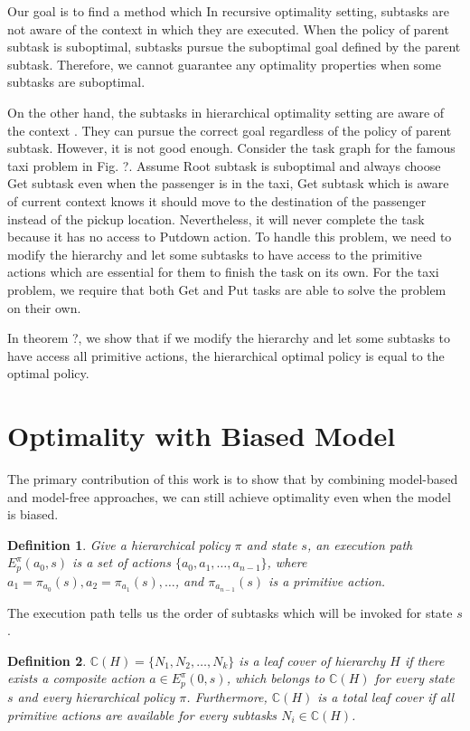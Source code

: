 \documentclass{article} %
\newtheorem{definition}{Definition}
\begin{document}
Our goal is to find a method which 
In recursive optimality setting, subtasks are not aware of the context in which they are executed.
When the policy of parent subtask is suboptimal, subtasks pursue the suboptimal goal defined by the parent subtask.
Therefore, we cannot guarantee any optimality properties when some subtasks are suboptimal.

On the other hand, the subtasks in hierarchical optimality setting are aware of the context . 
They can pursue the correct goal regardless of the policy of parent subtask.
However, it is not good enough. Consider the task graph for the famous taxi problem in Fig. ?.  
Assume Root subtask is suboptimal and always choose Get subtask even when 
the passenger is in the taxi, Get subtask which is aware of current context knows
it should move to the destination of the passenger instead of the pickup location.
Nevertheless, it will never complete the task because it has no access to Putdown 
action. To handle this problem, we need to modify the hierarchy and let some subtasks 
to have access to the primitive actions which are essential for them to finish
the task on its own. For the taxi problem, we require that both Get and Put tasks
are able to solve the problem on their own.

In theorem ?, we show that if we modify the hierarchy and let some subtasks to have access all primitive actions, 
the hierarchical optimal policy is equal to the optimal policy.

\section{Optimality with Biased Model}
The primary contribution of this work is to show that by combining model-based and 
model-free approaches, we can still achieve optimality even when the model is biased.


\begin{definition}
    Give a hierarchical policy $\pi$ and state $s$, an execution path $E_p^\pi(a_0, s)$ 
    is a set of actions $\{a_0, a_1, \dots, a_{n-1}\}$, where $a_1=\pi_{a_0}(s), a_2=\pi_{a_1}(s), \dots$,
    and $\pi_{a_{n-1}}(s)$ is a primitive action.
\end{definition}
The execution path tells us the order of subtasks which will be invoked for state $s$.


\begin{definition}
    $\mathbb{C}(H) = \{N_1, N_2, \dots, N_k\}$ is a leaf cover of hierarchy $H$ if 
    there exists a composite action $a \in E_p^{\pi}(0, s)$, which belongs to $\mathbb{C}(H)$ for every
    state $s$ and every hierarchical policy $\pi$.
    Furthermore, $\mathbb{C}(H)$ is a total leaf cover if all primitive actions are available for every 
    subtasks $N_i \in \mathbb{C}(H)$.
\end{definition}
\end{document}
